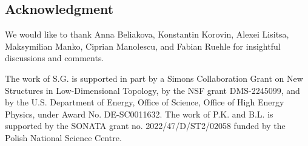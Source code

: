 
\subsection*{Acknowledgment}

We would like to thank Anna Beliakova, Konstantin Korovin, Alexei Lisitsa, Maksymilian Manko, Ciprian Manolescu, and Fabian Ruehle for insightful discussions and comments.

The work of S.G. is supported in part by a Simons Collaboration Grant on New Structures in Low-Dimensional Topology, by the NSF grant DMS-2245099, and by the U.S. Department of Energy, Office of Science, Office of High Energy Physics, under Award No. DE-SC0011632. The work of P.K. and B.L. is supported by the SONATA grant no. 2022/47/D/ST2/02058 funded by the Polish National Science Centre.